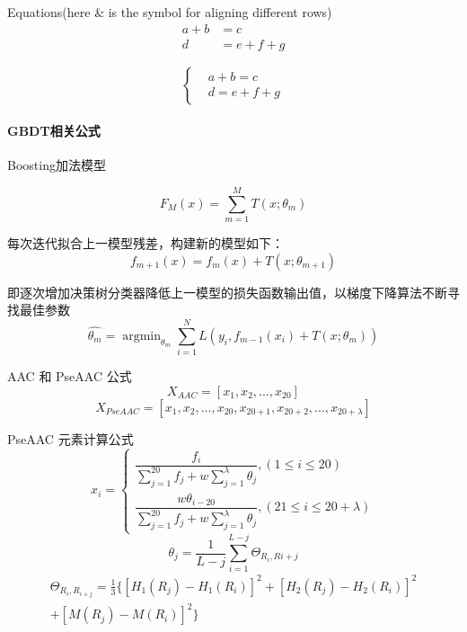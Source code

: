 \documentclass[UTF8]{ctexart}
\begin{document}
Equations(here \& is the symbol for aligning different rows)
\begin{align}
    a+b & =c     \\
    d   & =e+f+g
\end{align}

\[
    \left\{
    \begin{aligned}
         & a+b=c   \\
         & d=e+f+g
    \end{aligned}
    \right.
\]

\paragraph{GBDT相关公式}

Boosting加法模型

\begin{equation}
    F_M(x)=\sum_{m=1}^{M} T(x; \theta_m)
\end{equation}

每次迭代拟合上一模型残差，构建新的模型如下：
\[f_{m+1}(x)=f_{m}(x)+T(x; \theta_{m+1})\]

即逐次增加决策树分类器降低上一模型的损失函数输出值，以梯度下降算法不断寻找最佳参数
\begin{equation}
    \hat{\theta_m}=\mathop{\arg\min}_{\theta_m}\sum_{i=1}^{N}L(y_i, f_{m-1}(x_i)+T(x; \theta_m))
\end{equation}

AAC 和 PseAAC 公式
\begin{equation}
    X_{AAC}=\left [ x_{1},x_{2},...,x_{20} \right ]
\end{equation}
\begin{equation}
    X_{PseAAC}=\left [ x_{1},x_{2},...,x_{20},x_{20+1},x_{20+2},...,x_{20+\lambda}\right ]
\end{equation}

PseAAC 元素计算公式
\begin{equation}
    x_{i}=\begin{cases}
        \dfrac{f_{i}}{\sum_{j=1}^{20}f_{j}+w\sum_{j=1}^{\lambda}\theta_{j}},\left ( 1 \leq i \leq 20 \right ) \\
        \dfrac{w\theta_{i-20}}{\sum_{j=1}^{20}f_{j}+w\sum_{j=1}^{\lambda}\theta_{j}},\left ( 21\leq i \leq 20+\lambda \right )
    \end{cases}
\end{equation}
\begin{equation}
    \theta_{j}=\frac{1}{L-j}\sum_{i=1}^{L-j}\Theta_{R_{i},R{i+j}}
\end{equation}
\begin{multline} 
    \Theta_{R_{i},R_{i+j}}=\frac{1}{3} \{ \left[ H_{1}(R_{j}) - H_{1}(R_{i}) \right]^2 + \left[ H_{2}(R_{j}) - H_{2}(R_{i}) \right]^2 \\
    + \left[ M(R_{j}) - M(R_{i}) \right]^2 \}
\end{multline}
\end{document}

